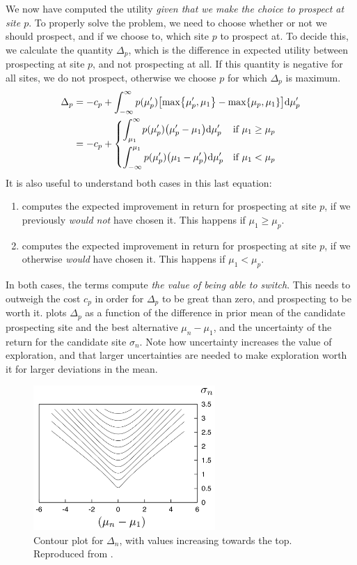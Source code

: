\documentclass[a4paper]{article}
\theoremstyle{definition}
\begin{document}
We now have computed the utility \emph{given that we make the choice to prospect at site $p$}. To properly solve the problem, we need to choose whether or not we should prospect, and if we choose to, which site $p$ to prospect at. To decide this, we calculate the quantity $\Delta_p$, which is the difference in expected utility between prospecting at site $p$, and not prospecting at all. If this quantity is negative for all sites, we do not prospect, otherwise we choose $p$ for which $\Delta_p$ is maximum.
\begin{align}
\Delta_p &= -c_p + \int_{-\infty}^{\infty} p(\mu_p') \left[\max\left\{\mu_p', \mu_1\right\} - \max\left\{\mu_p, \mu_1\right\}\right] \calcd{\mu_p'} \\
&= -c_p + \begin{dcases}
\int_{\mu_1}^\infty p(\mu_p')\left(\mu_p' - \mu_1\right)\calcd{\mu_p'} & \text{if } \mu_1 \geq \mu_p \\
\int_{-\infty}^{\mu_1}p(\mu_p')\left(\mu_1 - \mu_p'\right) \calcd{\mu_p'} & \text{if } \mu_1 < \mu_p
\end{dcases} \label{eq:prospecting-ei}
\end{align}
It is also useful to understand both cases in this last equation:
\begin{enumerate}[{Case} 1)]
\item computes the expected improvement in return for prospecting at site $p$, if we previously \emph{would not} have chosen it. This happens if $\mu_1 \geq \mu_p$.
\item computes the expected improvement in return for prospecting at site $p$, if we otherwise \emph{would} have chosen it. This happens if $\mu_1 < \mu_p$.
\end{enumerate}
In both cases, the terms compute \emph{the value of being able to switch}. This needs to outweigh the cost $c_p$ in order for $\Delta_p$ to be great than zero, and prospecting to be worth it.  plots $\Delta_p$ as a function of the difference in prior mean of the candidate prospecting site and the best alternative $\mu_n - \mu_1$, and the uncertainty of the return for the candidate site $\sigma_n$. Note how uncertainty increases the value of exploration, and that larger uncertainties are needed to make exploration worth it for larger deviations in the mean.

\begin{figure}[ht]
\centering
\includegraphics[height=5.5cm]{../slides/figures/exploration-bonus}
\caption{Contour plot for $\Delta_n$, with values increasing towards the top. Reproduced from \citet[ch.~36]{itila}.}
\label{fig:exploration-bonus}
\end{figure}
\end{document}
